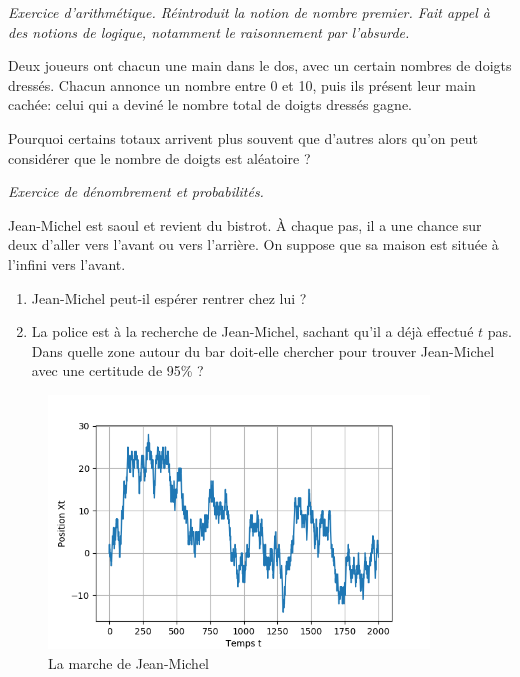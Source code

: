 \documentclass[12pt]{article}
\theoremstyle{definition}
\begin{document}
\textit{Exercice d'arithmétique. Réintroduit la notion de nombre premier. Fait appel à des notions de logique, notamment le raisonnement par l'absurde.}


\begin{exer}[La mourre]
	Deux joueurs ont chacun une main dans le dos, avec un certain nombres de doigts dressés. Chacun annonce un nombre entre 0 et 10, puis ils présent leur main cachée: celui qui a deviné le nombre total de doigts dressés gagne.
	
	Pourquoi certains totaux arrivent plus souvent que d'autres alors qu'on peut considérer que le nombre de doigts est aléatoire ?
\end{exer}

\textit{Exercice de dénombrement et probabilités.}

\begin{exer}
Jean-Michel est saoul et revient du bistrot. À chaque pas, il a une chance sur deux d'aller vers l'avant ou vers l'arrière. On suppose que sa maison est située à l'infini vers l'avant.
\begin{enumerate}
	\item Jean-Michel peut-il espérer rentrer chez lui ?
	\item La police est à la recherche de Jean-Michel, sachant qu'il a déjà effectué $t$ pas. Dans quelle zone autour du bar doit-elle chercher pour trouver Jean-Michel avec une certitude de 95\% ?
\end{enumerate}	

\end{exer}

\begin{figure}[!ht]
	\includegraphics[width=0.9\textwidth]{marcheJM.png}
	\caption{La marche de Jean-Michel}
\end{figure}
\end{document}
